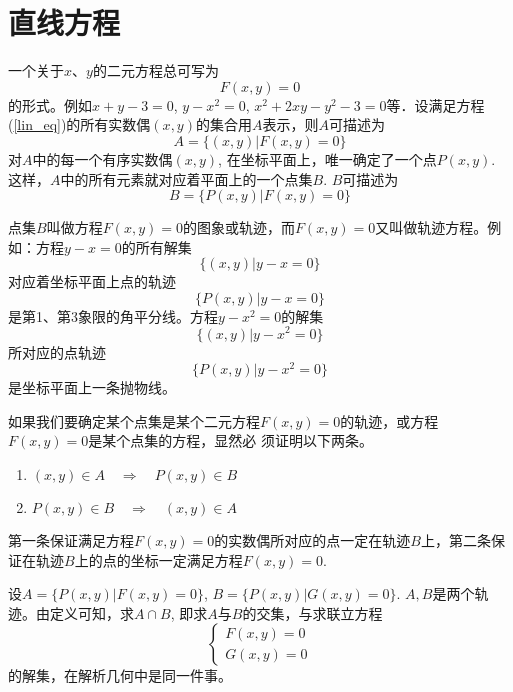 \section{直线方程}
一个关于$x$、$y$的二元方程总可写为
\begin{equation}\label{lin_eq}
 F (x,y) =0   
\end{equation}
的形式。例如$x+y-3=0$, $y-x^2=0$, $x^2+2xy-y^2-3=0$等．设满足方程(\ref{lin_eq})的所有实数偶$(x,y)$的集合用$A$表示，则$A$可描述为
\[A= \{ (x,y) |F (x,y) =0\} \]
对$A$中的每一个有序实数偶$(x,y)$, 在坐标平面上，唯一确定了一个点$P(x,y)$. 这样，$A$中的所有元素就对应着平面上的一个点集$B$. $B$可描述为
\[B= \{P (x,y) |F (x,y) =0\}\]

点集$B$叫做方程$F(x,y)=0$的图象或轨迹，而$F(x,y)=0$又叫做轨迹方程。例如：方程$y-x=0$的所有解集
\[\{ (x,y) |y-x=0\}\]
对应着坐标平面上点的轨迹
\[\{P (x,y) |y-x=0\} \]
是第1、第3象限的角平分线。方程$y-x^2=0$的解集
\[\{ (x,y) |y-x^2=0\}\]
所对应的点轨迹
\[\{P (x,y) |y-x^2=0\}\]
是坐标平面上一条抛物线。

如果我们要确定某个点集是某个二元方程$F(x,y)=0$的轨迹，或方程$F(x,y)=0$是某个点集的方程，显然必
须证明以下两条。
\begin{enumerate}
    \item $(x,y)\in A\quad \Rightarrow\quad P(x,y)\in B$
    \item $P (x,y) \in B\quad \Rightarrow\quad  (x,y) \in A$
\end{enumerate}
第一条保证满足方程$F(x,y)=0$的实数偶所对应的点一定在轨迹$B$上，第二条保证在轨迹$B$上的点的坐标一定满足方程$F(x,y)=0$.

设$A= \{P (x,y) |F (x,y) =0\}$, $B= \{P (x,y) |G (x,y) =0\}$. 
$A,B$是两个轨迹。由定义可知，求$A\cap B$, 即求$A$与$B$的交集，与求联立方程
\[\begin{cases}
   F (x,y) =0\\
   G (x,y) =0 
\end{cases}\]
的解集，在解析几何中是同一件事。

